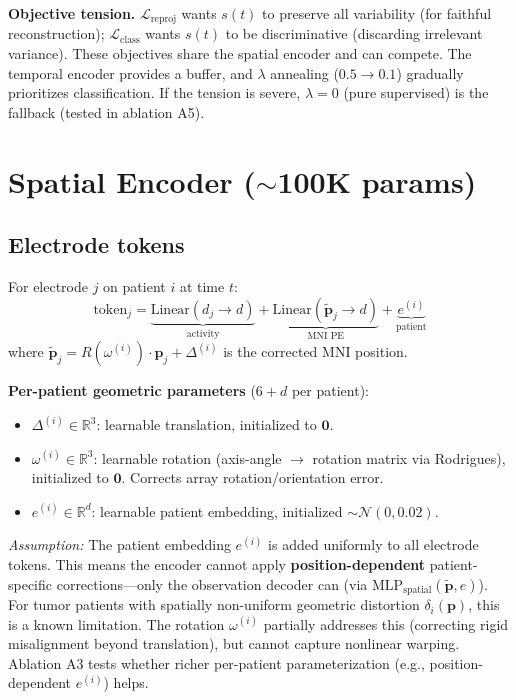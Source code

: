 \documentclass[11pt,letterpaper]{article}
\newcommand{\assumption}[1]{\par\smallskip\noindent\textcolor{BrickRed}{\textit{Assumption:} #1}\smallskip}
\newcommand{\bfp}{\mathbf{p}}
\newcommand{\R}{\mathbb{R}}
\begin{document}
\textbf{Objective tension.} $\mathcal{L}_{\text{reproj}}$ wants $s(t)$ to preserve all variability (for faithful reconstruction); $\mathcal{L}_{\text{class}}$ wants $s(t)$ to be discriminative (discarding irrelevant variance). These objectives share the spatial encoder and can compete. The temporal encoder provides a buffer, and $\lambda$ annealing ($0.5 \to 0.1$) gradually prioritizes classification. If the tension is severe, $\lambda{=}0$ (pure supervised) is the fallback (tested in ablation A5).


\section{Spatial Encoder (\texorpdfstring{${\sim}$100K}{~100K} params)}\label{sec:spatial-encoder}

\subsection{Electrode tokens}

For electrode $j$ on patient $i$ at time $t$:
\begin{equation}
\text{token}_j = \underbrace{\text{Linear}(d_j \to d)}_{\text{activity}} + \underbrace{\text{Linear}(\tilde{\bfp}_j \to d)}_{\text{MNI PE}} + \underbrace{e^{(i)}}_{\text{patient}}
\end{equation}
where $\tilde{\bfp}_j = R(\omega^{(i)}) \cdot \bfp_j + \Delta^{(i)}$ is the corrected MNI position.

\textbf{Per-patient geometric parameters} ($6 + d$ per patient):
\begin{itemize}[leftmargin=2em]
\item $\Delta^{(i)} \in \R^3$: learnable translation, initialized to $\mathbf{0}$.
\item $\omega^{(i)} \in \R^3$: learnable rotation (axis-angle $\to$ rotation matrix via Rodrigues), initialized to $\mathbf{0}$. Corrects array rotation/orientation error.
\item $e^{(i)} \in \R^d$: learnable patient embedding, initialized $\sim \mathcal{N}(0, 0.02)$.
\end{itemize}

\assumption{The patient embedding $e^{(i)}$ is added uniformly to all electrode tokens. This means the encoder cannot apply \textbf{position-dependent} patient-specific corrections---only the observation decoder can (via $\text{MLP}_{\text{spatial}}(\tilde{\bfp}, e)$). For tumor patients with spatially non-uniform geometric distortion $\delta_i(\bfp)$, this is a known limitation. The rotation $\omega^{(i)}$ partially addresses this (correcting rigid misalignment beyond translation), but cannot capture nonlinear warping. Ablation A3 tests whether richer per-patient parameterization (e.g., position-dependent $e^{(i)}$) helps.}
\end{document}
